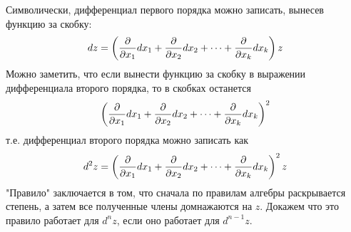 Символически, дифференциал первого порядка можно записать, вынесев функцию за скобку:
$$dz = \left(
{\partial \over \partial x_1}dx_1 +
{\partial \over \partial x_2}dx_2 +
\dots +
{\partial \over \partial x_k}dx_k
\right)z$$
Можно заметить, что если вынести функцию за скобку в выражении дифференциала второго порядка, то в скобках останется 
$$\left(
{\partial \over \partial x_1}dx_1 +
{\partial \over \partial x_2}dx_2 +
\dots +
{\partial \over \partial x_k}dx_k
\right)^2$$
т.е. дифференциал второго порядка можно записать как
$$d^2z = \left(
{\partial \over \partial x_1}dx_1 +
{\partial \over \partial x_2}dx_2 +
\dots +
{\partial \over \partial x_k}dx_k
\right)^2z$$
"Правило" заключается в том, что сначала по правилам алгебры раскрывается степень, а затем все полученные члены домнажаются на $z$.
Докажем что это правило работает для $d^nz$, если оно работает для $d^{n-1}z$.
